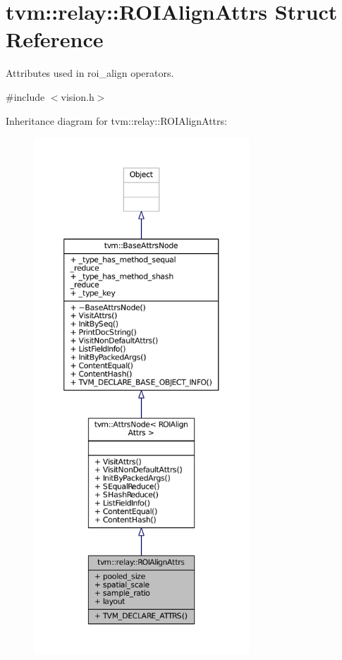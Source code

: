 \hypertarget{structtvm_1_1relay_1_1ROIAlignAttrs}{}\section{tvm\+:\+:relay\+:\+:R\+O\+I\+Align\+Attrs Struct Reference}
\label{structtvm_1_1relay_1_1ROIAlignAttrs}


Attributes used in roi\+\_\+align operators.  




{\ttfamily \#include $<$vision.\+h$>$}



Inheritance diagram for tvm\+:\+:relay\+:\+:R\+O\+I\+Align\+Attrs\+:
\nopagebreak
\begin{figure}[H]
\begin{center}
\leavevmode
\includegraphics[height=550pt]{structtvm_1_1relay_1_1ROIAlignAttrs__inherit__graph}
\end{center}
\end{figure}


